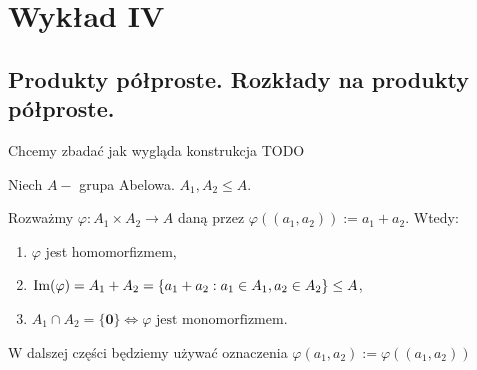 \chapter{Wykład IV}
\section{Produkty półproste. Rozkłady na produkty półproste.}
\begin{context}

Chcemy zbadać jak wygląda konstrukcja TODO	
\end{context}
\begin{fact}

Niech $A-$ grupa Abelowa. $A_1, A_2 \le A$. 

Rozważmy $\varphi : A_1\times A_2 \rightarrow A$ daną przez $\varphi((a_1,a_2)) := a_1 + a_2$. Wtedy:
	\begin{enumerate}[label=\roman*)]
		\item $\varphi$ jest homomorfizmem,
		\item $\operatorname{Im}(\varphi) = A_1 + A_2 = \{a_1+a_2: a_1 \in A_1, a_2\in A_2\} \le A$,
		\item $A_1 \cap A_2 = \{\mathbf{0}\} \iff \varphi \text{ jest monomorfizmem.}$
	\end{enumerate}

W dalszej części będziemy używać oznaczenia $\varphi(a_1,a_2) := \varphi((a_1,a_2))$
\end{fact}

